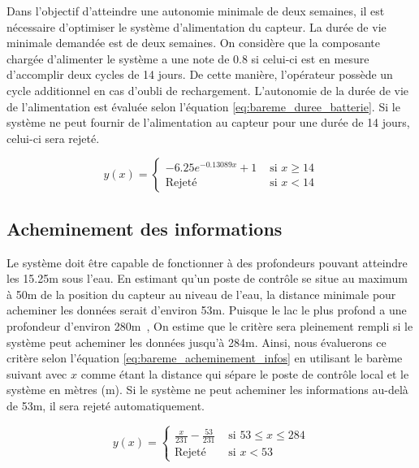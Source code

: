 Dans l'objectif d'atteindre une autonomie minimale de deux semaines, il est nécessaire d'optimiser le système d'alimentation du capteur. %
La durée de vie minimale demandée est de deux semaines. On considère que la composante chargée d'alimenter le système a une note de 0.8 si celui-ci est en mesure d'accomplir deux cycles de 14 jours. De cette manière, l'opérateur possède un cycle additionnel en cas d'oubli de rechargement. L'autonomie de la durée de vie de l'alimentation est évaluée selon l'équation \ref{eq:bareme_duree_batterie}. Si le système ne peut fournir de l'alimentation au capteur pour une durée de 14 jours, celui-ci sera rejeté.

\begin{equation}
    y(x) = \begin{cases}
        -6.25 e^{-0.13089x}+1 & \text{ si } x \geq 14\\
        \text{Rejeté} & \text{ si } x < 14
    \end{cases}
    \label{eq:bareme_duree_batterie}
\end{equation}


\subsection{Acheminement des informations}
\label{Adi}

Le système doit être capable de fonctionner à des profondeurs pouvant atteindre les 15.25m sous l’eau. En estimant qu'un poste de contrôle se situe au maximum à 50m de la position du capteur au niveau de l'eau, la distance minimale pour acheminer les données serait d'environ 53m. Puisque le lac le plus profond a une profondeur d'environ 280m~\cite{Lac_walker}, On estime que le critère sera pleinement rempli si le système peut acheminer les données jusqu'à 284m. Ainsi, nous évaluerons ce critère selon l'équation \ref{eq:bareme_acheminement_infos} en utilisant le barème suivant avec $x$ comme étant la distance qui sépare le poste de contrôle local et le système en mètres (m). Si le système ne peut acheminer les informations au-delà de 53m, il sera rejeté automatiquement.

\begin{equation}
    y(x) = \begin{cases}
        \frac{x}{231} - \frac{53}{231} & \text{ si } 53 \leq x \leq 284\\
        \text{Rejeté} & \text{ si } x < 53
    \end{cases}
    \label{eq:bareme_acheminement_infos}
\end{equation}


